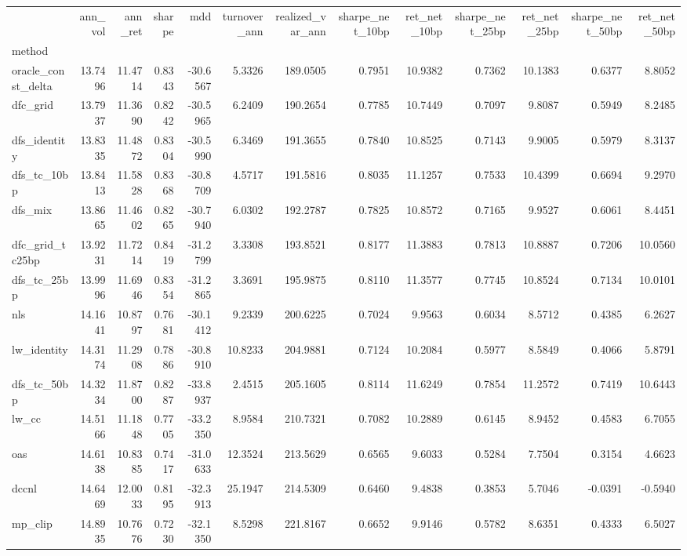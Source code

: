 \begin{tabular}{lrrrrrrrrrrrr}
\toprule
 & ann_vol & ann_ret & sharpe & mdd & turnover_ann & realized_var_ann & sharpe_net_10bp & ret_net_10bp & sharpe_net_25bp & ret_net_25bp & sharpe_net_50bp & ret_net_50bp \\
method &  &  &  &  &  &  &  &  &  &  &  &  \\
\midrule
oracle_const_delta & 13.7496 & 11.4714 & 0.8343 & -30.6567 & 5.3326 & 189.0505 & 0.7951 & 10.9382 & 0.7362 & 10.1383 & 0.6377 & 8.8052 \\
dfc_grid & 13.7937 & 11.3690 & 0.8242 & -30.5965 & 6.2409 & 190.2654 & 0.7785 & 10.7449 & 0.7097 & 9.8087 & 0.5949 & 8.2485 \\
dfs_identity & 13.8335 & 11.4872 & 0.8304 & -30.5990 & 6.3469 & 191.3655 & 0.7840 & 10.8525 & 0.7143 & 9.9005 & 0.5979 & 8.3137 \\
dfs_tc_10bp & 13.8413 & 11.5828 & 0.8368 & -30.8709 & 4.5717 & 191.5816 & 0.8035 & 11.1257 & 0.7533 & 10.4399 & 0.6694 & 9.2970 \\
dfs_mix & 13.8665 & 11.4602 & 0.8265 & -30.7940 & 6.0302 & 192.2787 & 0.7825 & 10.8572 & 0.7165 & 9.9527 & 0.6061 & 8.4451 \\
dfc_grid_tc25bp & 13.9231 & 11.7214 & 0.8419 & -31.2799 & 3.3308 & 193.8521 & 0.8177 & 11.3883 & 0.7813 & 10.8887 & 0.7206 & 10.0560 \\
dfs_tc_25bp & 13.9996 & 11.6946 & 0.8354 & -31.2865 & 3.3691 & 195.9875 & 0.8110 & 11.3577 & 0.7745 & 10.8524 & 0.7134 & 10.0101 \\
nls & 14.1641 & 10.8797 & 0.7681 & -30.1412 & 9.2339 & 200.6225 & 0.7024 & 9.9563 & 0.6034 & 8.5712 & 0.4385 & 6.2627 \\
lw_identity & 14.3174 & 11.2908 & 0.7886 & -30.8910 & 10.8233 & 204.9881 & 0.7124 & 10.2084 & 0.5977 & 8.5849 & 0.4066 & 5.8791 \\
dfs_tc_50bp & 14.3234 & 11.8700 & 0.8287 & -33.8937 & 2.4515 & 205.1605 & 0.8114 & 11.6249 & 0.7854 & 11.2572 & 0.7419 & 10.6443 \\
lw_cc & 14.5166 & 11.1848 & 0.7705 & -33.2350 & 8.9584 & 210.7321 & 0.7082 & 10.2889 & 0.6145 & 8.9452 & 0.4583 & 6.7055 \\
oas & 14.6138 & 10.8385 & 0.7417 & -31.0633 & 12.3524 & 213.5629 & 0.6565 & 9.6033 & 0.5284 & 7.7504 & 0.3154 & 4.6623 \\
dccnl & 14.6469 & 12.0033 & 0.8195 & -32.3913 & 25.1947 & 214.5309 & 0.6460 & 9.4838 & 0.3853 & 5.7046 & -0.0391 & -0.5940 \\
mp_clip & 14.8935 & 10.7676 & 0.7230 & -32.1350 & 8.5298 & 221.8167 & 0.6652 & 9.9146 & 0.5782 & 8.6351 & 0.4333 & 6.5027 \\

\end{tabular}
